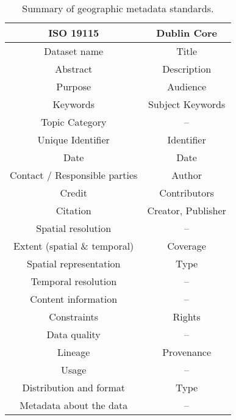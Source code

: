 \documentclass{isprs} %
\begin{document}
\begin{table}[h]
	\centering
		\begin{tabular}{|c c|}\hline
		    ISO 19115 &                     Dublin Core\\\hline
			Dataset name &                  Title  \\
			Abstract &                      Description \\
			Purpose &                       Audience \\
			Keywords &                      Subject Keywords \\
			Topic Category &                -- \\
			Unique Identifier &             Identifier \\
			Date &                          Date \\
			Contact / Responsible parties&  Author \\
			Credit &                        Contributors \\ 
			Citation &                      Creator, Publisher \\
			Spatial resolution &            -- \\
			Extent (spatial \& temporal) &  Coverage \\
			Spatial representation &        Type \\
			Temporal resolution &           -- \\
			Content information &           -- \\
			Constraints &                   Rights \\ 
			Data quality &                  -- \\
			Lineage &                       Provenance \\
			Usage &                         -- \\
			Distribution and format &       Type \\
			Metadata about the data &       -- \\
			\hline
		\end{tabular}
	\caption{Summary of geographic metadata standards.}
\label{tab:Metadata_Standards}
\end{table}
\end{document}
